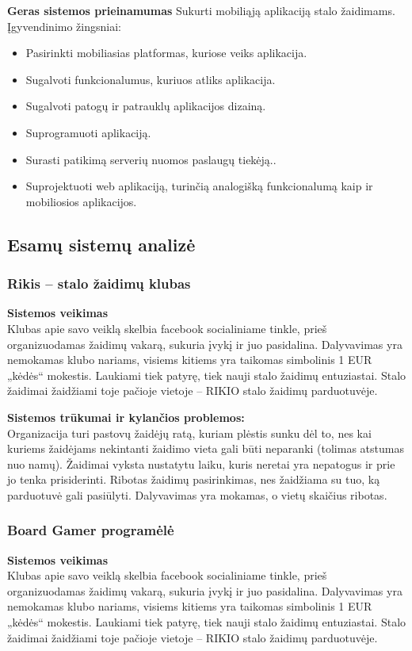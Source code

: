 \documentclass{VUMIFPSkursinis}
\begin{document}
			\textbf{Geras sistemos prieinamumas}
			Sukurti mobiliąją aplikaciją stalo žaidimams. Įgyvendinimo žingsniai:
			\renewcommand{\labelitemi}{$\bullet$}
				\begin{itemize}
					\item Pasirinkti mobiliasias platformas, kuriose veiks aplikacija.
					\item Sugalvoti funkcionalumus, kuriuos atliks aplikacija.
					\item Sugalvoti patogų ir patrauklų aplikacijos dizainą.
					\item Suprogramuoti aplikaciją.
					\item Surasti patikimą serverių nuomos paslaugų tiekėją..
					\item Suprojektuoti web aplikaciją, turinčią analogišką funkcionalumą kaip ir mobiliosios aplikacijos.
				\end{itemize}
				
	\subsection{Esamų sistemų analizė}
		\subsubsection{Rikis – stalo žaidimų klubas}
			\textbf{Sistemos veikimas}\\
			Klubas apie savo veiklą skelbia facebook socialiniame tinkle, prieš 
			organizuodamas žaidimų vakarą, sukuria įvykį ir juo pasidalina. 
			Dalyvavimas yra nemokamas klubo nariams, visiems kitiems yra taikomas 
			simbolinis 1 EUR „kėdės“ mokestis. Laukiami tiek patyrę, tiek nauji 
			stalo žaidimų entuziastai. Stalo žaidimai žaidžiami toje pačioje vietoje 
			– RIKIO stalo žaidimų parduotuvėje.

			\textbf{Sistemos trūkumai ir kylančios problemos:}\\
			Organizacija turi pastovų žaidėjų ratą, kuriam plėstis sunku dėl to, 
			nes kai kuriems žaidėjams nekintanti žaidimo vieta gali būti neparanki 
			(tolimas atstumas nuo namų). Žaidimai vyksta nustatytu laiku, kuris 
			neretai yra nepatogus ir prie jo tenka prisiderinti. Ribotas žaidimų 
			pasirinkimas, nes žaidžiama su tuo, ką parduotuvė gali pasiūlyti. 
			Dalyvavimas yra mokamas, o vietų skaičius ribotas.
				
		\subsubsection{Board Gamer programėlė}
			\textbf{Sistemos veikimas}\\
			Klubas apie savo veiklą skelbia facebook socialiniame tinkle, prieš 
			organizuodamas žaidimų vakarą, sukuria įvykį ir juo pasidalina. 
			Dalyvavimas yra nemokamas klubo nariams, visiems kitiems yra taikomas 
			simbolinis 1 EUR „kėdės“ mokestis. Laukiami tiek patyrę, tiek nauji 
			stalo žaidimų entuziastai. Stalo žaidimai žaidžiami toje pačioje vietoje 
			– RIKIO stalo žaidimų parduotuvėje.
			
\end{document}
